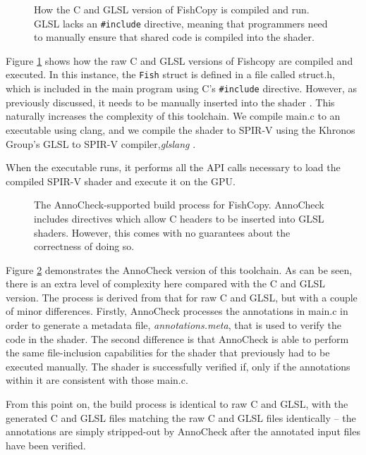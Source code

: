 \documentclass[a4paper,12pt,twoside,openright]{report}
\begin{document}
\begin{figure}[h]
\centering
\def\svgwidth{0.8\linewidth}

\caption{How the C and GLSL version of FishCopy is compiled and run. GLSL lacks
an \texttt{\#include} directive, meaning that programmers need to manually
ensure that shared code is compiled into the shader.}
\label{fig:pipeline_basic}
\end{figure}

Figure \ref{fig:pipeline_basic} shows how the raw C and GLSL versions of
Fishcopy are compiled and executed. In this instance, the \texttt{Fish} struct
is defined in a file called struct.h, which is included in the main program
using C's \texttt{\#include} directive. However, as previously discussed, it
needs to be manually inserted into the shader \cite{NoIncludeGLSL}. This
naturally increases the complexity of this toolchain. We compile main.c to an
executable using clang, and we compile the shader to SPIR-V using the Khronos
Group's GLSL to SPIR-V compiler,\textit{glslang} \cite{Clang} \cite{glslang}.

When the executable runs, it performs all the API calls necessary to load the
compiled SPIR-V shader and execute it on the GPU.

\begin{figure}[h]
\centering
\def\svgwidth{0.8\linewidth}

\caption{The AnnoCheck-supported build process for FishCopy. AnnoCheck includes
directives which allow C headers to be inserted into GLSL shaders. However, this
comes with no guarantees about the correctness of doing so.}
\label{fig:pipeline_anno_check}
\end{figure}

Figure \ref{fig:pipeline_anno_check} demonstrates the AnnoCheck version of this
toolchain. As can be seen, there is an extra level of complexity here compared
with the C and GLSL version. The process is derived from that for raw C and
GLSL, but with a couple of minor differences. Firstly, AnnoCheck processes the
annotations in main.c in order to generate a metadata file,
\textit{annotations.meta}, that is used to verify the code in the shader. The
second difference is that AnnoCheck is able to perform the same file-inclusion
capabilities for the shader that previously had to be executed manually. The
shader is successfully verified if, only if the annotations within it are
consistent with those main.c.

From this point on, the build process is identical to raw C and GLSL, with the
generated C and GLSL files matching the raw C and GLSL files identically -- the
annotations are simply stripped-out by AnnoCheck after the annotated input
files have been verified.
\end{document}
